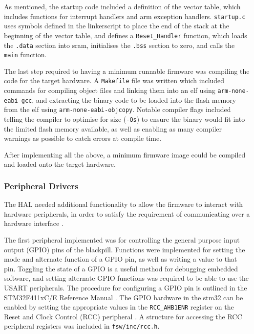 \documentclass[../report.tex]{subfiles}
\begin{document}
As mentioned, the startup code included a definition of the vector table, which
includes functions for interrupt handlers and arm exception handlers.
\lstinline|startup.c| uses symbols defined in the linkerscript to place the end
of the stack at the beginning of the vector table, and defines a
\lstinline|Reset_Handler| function, which loads the \lstinline|.data| section
into sram, initialises the \lstinline|.bss| section to zero, and calls the
\lstinline|main| function.

The last step required to having a minimum runnable firmware was compiling the
code for the target hardware. A \lstinline|Makefile| file was written which
included commands for compiling object files and linking them into an elf using
\lstinline|arm-none-eabi-gcc|, and extracting the binary code to be loaded into
the flash memory from the elf using \lstinline|arm-none-eabi-objcopy|. Notable
compiler flags included telling the compiler to optimise for size
(\lstinline|-Os|) to ensure the binary would fit into the limited flash memory
available, as well as enabling as many compiler warnings as possible to catch
errors at compile time.

After implementing all the above, a minimum firmware image could be compiled
and loaded onto the target hardware.

\subsubsection{Peripheral Drivers}

The HAL needed additional functionality to allow the firmware to interact with
hardware peripherals, in order to satisfy the requirement of communicating over
a hardware interface .

The first peripheral implemented was for controlling the general purpose input
output (GPIO) pins of the blackpill. Functions were implemented for setting the
mode and alternate function of a GPIO pin, as well as writing a value to that
pin. Toggling the state of a GPIO is a useful method for debugging embedded
software, and setting alternate GPIO functions was required to be able to use the
USART peripherals. The procedure for configuring a GPIO pin is outlined in the
STM32F411xC/E Reference Manual \citep{stm32f4_manual}. The GPIO hardware in the
stm32 can be enabled by setting the appropriate values in the
\lstinline|RCC_AHB1ENR| register on the Reset and Clock Control (RCC)
peripheral \citep{stm32f4_manual}. A structure for accessing the RCC peripheral
registers was included in \lstinline|fsw/inc/rcc.h|.
\end{document}
